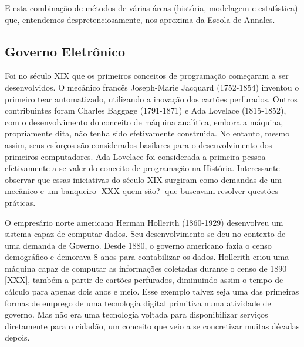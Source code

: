\documentclass[
12pt,		%
openright,	%
twoside,  %
a4paper,			%
chapter=TITLE,		%
english,			%
french,				%
spanish,			%
brazil				%
]{USPSC-classe/USPSC}
\begin{document}
E esta combina\c{c}\~ao de m\'etodos de v\'arias \'areas (hist\'oria, modelagem e estat\'{\i}stica) que, entendemos despretenciosamente, nos aproxima da Escola de Annales.














\subsection[Governo Eletr\^onico]{Governo Eletr\^onico}\label{Governo Eletr\^onico}
Foi no s\'eculo XIX que os primeiros conceitos de programa\c{c}\~ao come\c{c}aram a ser desenvolvidos. O mec\^anico franc\^es Joseph-Marie Jacquard (1752-1854) inventou o primeiro tear automatizado, utilizando a inova\c{c}\~ao dos cart\~oes perfurados. Outros contribuintes foram Charles Baggage (1791-1871) e Ada Lovelace (1815-1852), com o desenvolvimento do conceito de m\'aquina anal\'{\i}tica, embora a m\'aquina, propriamente dita, n\~ao tenha sido efetivamente constru\'{\i}da. No entanto, mesmo assim, seus esfor\c{c}os s\~ao considerados basilares para o desenvolvimento dos primeiros computadores. Ada Lovelace foi considerada a primeira pessoa efetivamente a se valer do conceito de programa\c{c}\~ao na Hist\'oria. Interessante observar que essas iniciativas do s\'eculo XIX surgiram como demandas de um mec\^anico e um banqueiro [XXX quem s\~ao?] que buscavam resolver quest\~oes pr\'aticas.














O empres\'ario norte americano Herman Hollerith (1860-1929) desenvolveu um sistema capaz de computar dados. Seu desenvolvimento se deu no contexto de uma demanda de Governo. Desde 1880, o governo americano fazia o censo demogr\'afico e demorava 8 anos para contabilizar os dados. Hollerith criou uma m\'aquina capaz de computar as informa\c{c}\~oes coletadas durante o censo de 1890 [XXX], tamb\'em a partir de cart\~oes perfurados, diminuindo assim o tempo de c\'alculo para apenas dois anos e meio. Esse exemplo talvez seja uma das primeiras formas de emprego de uma tecnologia digital primitiva numa atividade de governo. Mas n\~ao era uma tecnologia voltada para disponibilizar servi\c{c}os diretamente para o cidad\~ao, um conceito que veio a se concretizar muitas d\'ecadas depois.
\end{document}
